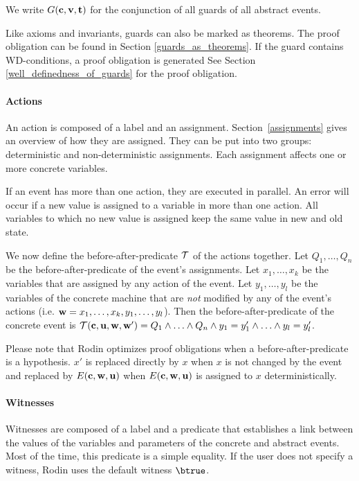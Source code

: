 We write $G(\mathbf{c},\mathbf{v},\mathbf{t})$ for the conjunction of all guards of all abstract events.

Like axioms and invariants, guards can also be marked as theorems. 
The proof obligation can be found in Section \ref{guards_as_theorems}.
If the guard contains WD-conditions, a proof obligation is generated
See Section \ref{well_definedness_of_guards} for the proof obligation.

\paragraph{Actions}
\label{actions}
An action is composed of a label and an assignment.
Section~\ref{assignments} gives an overview of how they are assigned.
They can be put into two groups: deterministic and non-deterministic assignments.
Each assignment affects one or more concrete variables.

If an event has more than one action, they are executed in parallel. 
An error will occur if a new value is assigned to a variable in more than one action.
All variables to which no new value is assigned keep the same value in new and old state.

We now define the before-after-predicate $\mathcal{T}$ of the actions together.
Let $Q_1,\ldots,Q_n$ be the before-after-predicate of the event's assignments. 
Let $x_1,\ldots,x_k$ be the variables that are assigned by any action of the event.
Let $y_1,\ldots,y_l$ be the variables of the concrete machine that are \emph{not} modified by any of 
 the event's actions (i.e. $\mathbf{w} = x_1,\ldots,x_k,y_1,\ldots,y_l$).
Then the before-after-predicate of the concrete event is 
  $\mathcal{T}(\mathbf{c},\mathbf{u},\mathbf{w},\mathbf{w}') = Q_1 \land \ldots \land Q_n \land y_1 = y_1' \land \ldots \land y_l=y_l'$.

Please note that Rodin optimizes proof obligations when a before-after-predicate is a hypothesis.
$x'$ is replaced directly by $x$ when $x$ is not changed by the event and replaced by $E(\mathbf{c},\mathbf{w},\mathbf{u})$
 when $E(\mathbf{c},\mathbf{w},\mathbf{u})$ is assigned to $x$ deterministically.

\paragraph{Witnesses}
\label{witness}

Witnesses are composed of a label and a predicate that establishes a link between the values 
  of the variables and parameters of the concrete and abstract events.
Most of the time, this predicate is a simple equality.
If the user does not specify a witness, Rodin uses the default witness $\btrue$.

